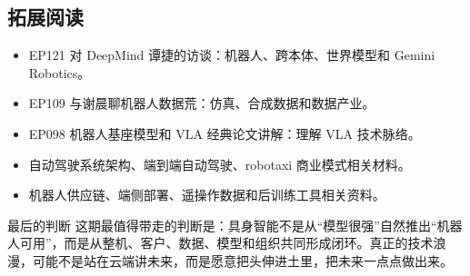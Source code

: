 \subsection{拓展阅读}

\begin{itemize}
\item EP121 对 DeepMind 谭捷的访谈：机器人、跨本体、世界模型和 Gemini Robotics。
\item EP109 与谢晨聊机器人数据荒：仿真、合成数据和数据产业。
\item EP098 机器人基座模型和 VLA 经典论文讲解：理解 VLA 技术脉络。
\item 自动驾驶系统架构、端到端自动驾驶、robotaxi 商业模式相关材料。
\item 机器人供应链、端侧部署、遥操作数据和后训练工具相关资料。
\end{itemize}

\begin{importantbox}{最后的判断}
这期最值得带走的判断是：具身智能不是从“模型很强”自然推出“机器人可用”，而是从整机、客户、数据、模型和组织共同形成闭环。真正的技术浪漫，可能不是站在云端讲未来，而是愿意把头伸进土里，把未来一点点做出来。
\end{importantbox}


